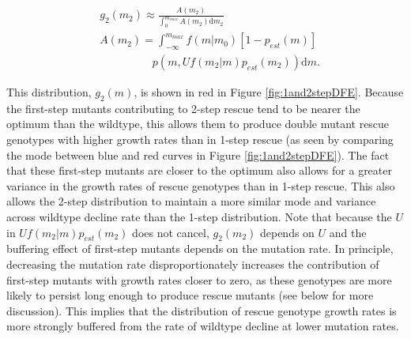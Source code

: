 \documentclass[9pt,twocolumn,twoside,lineno]{gsajnl}
\begin{document}
\begin{equation}\label{eq:g2m}
\begin{aligned}
&g_2(m_2) \approx \frac{A(m_2)}{\int_0^{m_{max}} A(m_2) \mathrm{d}m_2} \\
&A(m_2) = \int_{-\infty}^{m_{max}} f(m|m_0) \left[ 1 - p_{est}(m) \right] \\
&\hspace{2cm}p(m,U f(m_2|m) p_{est}(m_2))\mathrm{d}m.
\end{aligned}
\end{equation}

\noindent This distribution, $g_2(m)$, is shown in red in Figure \ref{fig:1and2stepDFE}.
Because the first-step mutants contributing to 2-step rescue tend to be nearer the optimum than the wildtype, this allows them to produce double mutant rescue genotypes with higher growth rates than in 1-step rescue (as seen by comparing the mode between blue and red curves in Figure \ref{fig:1and2stepDFE}).
The fact that these first-step mutants are closer to the optimum also allows for a greater variance in the growth rates of rescue genotypes than in 1-step rescue.
This also allows the 2-step distribution to maintain a more similar mode and variance across wildtype decline rate than the 1-step distribution. %
Note that because the $U$ in $U f(m_2|m) p_{est}(m_2)$ does not cancel, $g_2(m_2)$ depends on $U$ and the buffering effect of first-step mutants depends on the mutation rate. 
In principle, decreasing the mutation rate disproportionately increases the contribution of first-step mutants with growth rates closer to zero, as these genotypes are more likely to persist long enough to produce rescue mutants (see  below for more discussion).
This implies that the distribution of rescue genotype growth rates is more strongly buffered from the rate of wildtype decline at lower mutation rates.
\end{document}
